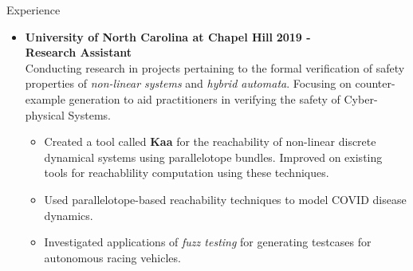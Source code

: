 \documentclass{resume} %
\begin{document}
\begin{rSection}{Experience}
  \begin{itemize}[leftmargin=*]
    \item
      {\bf University of North Carolina at Chapel Hill} \hfill {\bf 2019 -} \\
      {\bf Research Assistant} \\
      Conducting research in projects pertaining to the formal verification of safety properties of \emph{non-linear systems} and \emph{hybrid automata}. Focusing on counter-example generation to aid practitioners in verifying the safety of Cyber-physical Systems.
        \begin{itemize}[label=$\blackdiamond$]
            \item Created a tool called {\bf Kaa} for the reachability of non-linear discrete dynamical systems using parallelotope bundles. Improved on existing tools for reachablility computation using these techniques.
            \item Used parallelotope-based reachability techniques to model COVID disease dynamics.
            \item Investigated applications of \emph{fuzz testing} for generating testcases for autonomous racing vehicles.
        \end{itemize}
  \end{itemize}


\end{rSection}

\newpage
\end{document}
